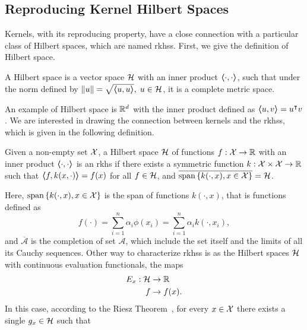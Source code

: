 \subsection{Reproducing Kernel Hilbert Spaces}
%
Kernels, with its reproducing property, have a close connection with a particular class of Hilbert spaces, which are named \acrfull{rkhss}. First, we give the definition of Hilbert space.
%
\begin{definition}
    A Hilbert space is a vector space $\mathcal{H}$ with an inner product $\bm{\left\langle} \cdot, \cdot \bm{\right\rangle}$, such that under the norm defined by $\left\lVert u\right\rVert = \sqrt{\bm{\left\langle} u, u \bm{\right\rangle}}, \; u \in \mathcal{H}$, it is a complete metric space.
\end{definition}
%
An example of Hilbert space is $\mathbb{R}^d$ with the inner product defined as $\bm{\left\langle} u, v \bm{\right\rangle} = u^\intercal v$.
%
We are interested in drawing the connection between kernels and the \acrshort{rkhss}, which is given in the following definition.
\begin{definition}
    Given a non-empty set $\mathcal{X}$, a Hilbert space $\mathcal{H}$ of functions $f: \mathcal{X} \to \mathbb{R}$ with an inner product $\bm{\left\langle} \cdot, \cdot \bm{\right\rangle}$ is an \acrshort{rkhs} if there exists a symmetric function $k: \mathcal{X} \times \mathcal{X} \to \mathbb{R}$ such that $\bm{\left\langle} f, k(x, \cdot) \bm{\right\rangle} = f(x)$ for all $f \in \mathcal{H}$, and $\overline{\operatorname{span}{\left\{k(\cdot, x), x \in \mathcal{X}\right\}}} = \mathcal{H}$. 
\end{definition}
Here, $\operatorname{span}{\left\{k(\cdot, x), x \in \mathcal{X}\right\}}$ is the span of functions $k(\cdot, x)$, that is functions defined as
$$ f(\cdot) = \sum_{i=1}^n \alpha_i \phi(x_i) =\sum_{i=1}^n \alpha_i k(\cdot, x_i), $$
and $\overline{\mathcal{A}}$ is the completion of set $\mathcal{A}$, which include the set itself and the limits of all its Cauchy sequences.
Other way to characterize \acrshort{rkhss} is as the Hilbert spaces $\mathcal{H}$ with continuous evaluation functionals, the maps
\begin{equation}
            \begin{aligned}
        \nonumber
        E_{x}: \mathcal{H} &\to \mathbb{R} \\
        f &\to f(x) .
    \end{aligned}
\end{equation}
In this case, according to the Riesz Theorem~\citep{Whittaker1991ACI}, for every $x \in \mathcal{X}$ there exists a single $g_x \in \mathcal{H}$ such that
